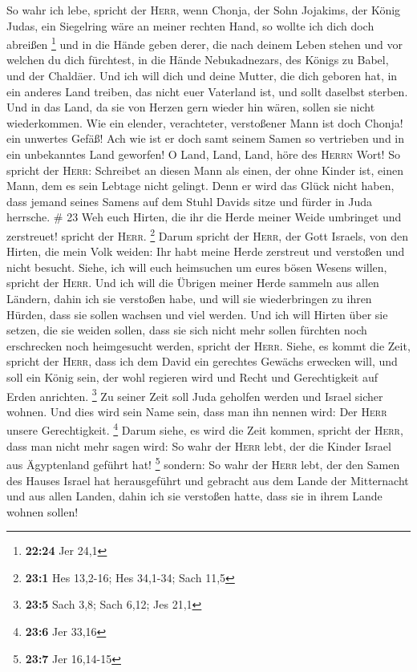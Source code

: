  So wahr ich lebe, spricht der \textsc{Herr}, wenn
Chonja, der Sohn Jojakims, der König Judas, ein Siegelring wäre an
meiner rechten Hand, so wollte ich dich doch abreißen \footnote{\textbf{22:24}
  Jer 24,1}  und in die Hände geben derer, die nach
deinem Leben stehen und vor welchen du dich fürchtest, in die Hände
Nebukadnezars, des Königs zu Babel, und der Chaldäer. 
Und ich will dich und deine Mutter, die dich geboren hat, in ein anderes
Land treiben, das nicht euer Vaterland ist, und sollt daselbst sterben.
 Und in das Land, da sie von Herzen gern wieder hin
wären, sollen sie nicht wiederkommen.  Wie ein elender,
verachteter, verstoßener Mann ist doch Chonja! ein unwertes Gefäß! Ach
wie ist er doch samt seinem Samen so vertrieben und in ein unbekanntes
Land geworfen!  O Land, Land, Land, höre des
\textsc{Herrn} Wort!  So spricht der \textsc{Herr}:
Schreibet an diesen Mann als einen, der ohne Kinder ist, einen Mann, dem
es sein Lebtage nicht gelingt. Denn er wird das Glück nicht haben, dass
jemand seines Samens auf dem Stuhl Davids sitze und fürder in Juda
herrsche. \# 23  Weh euch Hirten, die ihr die Herde meiner
Weide umbringet und zerstreuet! spricht der \textsc{Herr}. \footnote{\textbf{23:1}
  Hes 13,2-16; Hes 34,1-34; Sach 11,5}  Darum spricht der
\textsc{Herr}, der Gott Israels, von den Hirten, die mein Volk weiden:
Ihr habt meine Herde zerstreut und verstoßen und nicht besucht. Siehe,
ich will euch heimsuchen um eures bösen Wesens willen, spricht der
\textsc{Herr}.  Und ich will die Übrigen meiner Herde
sammeln aus allen Ländern, dahin ich sie verstoßen habe, und will sie
wiederbringen zu ihren Hürden, dass sie sollen wachsen und viel werden.
 Und ich will Hirten über sie setzen, die sie weiden
sollen, dass sie sich nicht mehr sollen fürchten noch erschrecken noch
heimgesucht werden, spricht der \textsc{Herr}.  Siehe, es
kommt die Zeit, spricht der \textsc{Herr}, dass ich dem David ein
gerechtes Gewächs erwecken will, und soll ein König sein, der wohl
regieren wird und Recht und Gerechtigkeit auf Erden anrichten.
\footnote{\textbf{23:5} Sach 3,8; Sach 6,12; Jes 21,1}  Zu
seiner Zeit soll Juda geholfen werden und Israel sicher wohnen. Und dies
wird sein Name sein, dass man ihn nennen wird: Der \textsc{Herr} unsere
Gerechtigkeit. \footnote{\textbf{23:6} Jer 33,16}  Darum
siehe, es wird die Zeit kommen, spricht der \textsc{Herr}, dass man
nicht mehr sagen wird: So wahr der \textsc{Herr} lebt, der die Kinder
Israel aus Ägyptenland geführt hat! \footnote{\textbf{23:7} Jer 16,14-15}
 sondern: So wahr der \textsc{Herr} lebt, der den Samen
des Hauses Israel hat herausgeführt und gebracht aus dem Lande der
Mitternacht und aus allen Landen, dahin ich sie verstoßen hatte, dass
sie in ihrem Lande wohnen sollen!

